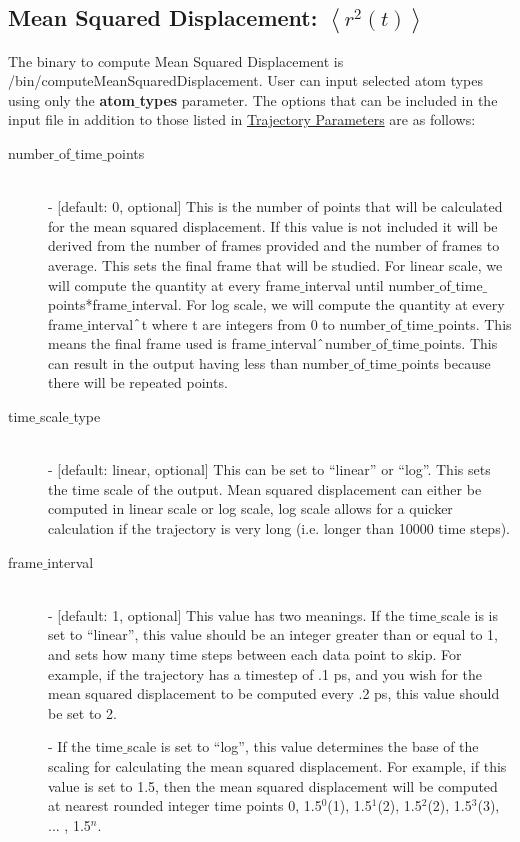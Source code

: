 \documentclass{article}
\begin{document}
\subsection{Mean Squared Displacement: $\left<r^2(t)\right>$} \label{sec::MSD_parm}
The binary to compute Mean Squared Displacement is /bin/computeMeanSquaredDisplacement. User can input selected atom types using only the \textbf{atom$\_$types} parameter. The options that can be included in the input file in addition to those listed in \hyperref[sec::general_parameters]{Trajectory Parameters} are as follows:
\begin{description}	
	\item[number$\_$of$\_$time$\_$points]\hfill \\
	- [default: 0, optional] This is the number of points that will be calculated for the mean squared displacement.  If this value is not included it will be derived from the number of frames provided and the number of frames to average.  This sets the final frame that will be studied.  For linear scale, we will compute the quantity at every frame$\_$interval until number$\_$of$\_$time$\_$points*frame$\_$interval.  For log scale, we will compute the quantity at every frame$\_$interval$\string^$t where t are integers from 0 to number$\_$of$\_$time$\_$points.  This means the final frame used is frame$\_$interval$\string^$number$\_$of$\_$time$\_$points.  This can result in the output having less than number$\_$of$\_$time$\_$points because there will be repeated points.
	
	\item[time$\_$scale$\_$type] \hfill \\
	- [default: linear, optional] This can be set to ``linear'' or ``log''.  This sets the time scale of the output. Mean squared displacement can either be computed in linear scale or log scale, log scale allows for a quicker calculation if the trajectory is very long (i.e. longer than 10000 time steps).
	
	\item[frame$\_$interval] \hfill \\
	- [default: 1, optional] This value has two meanings.  If the time$\_$scale is is set to ``linear'', this value should be an integer greater than or equal to 1, and sets how many time steps between each data point to skip.  For example, if the trajectory has a timestep of .1 ps, and you wish for the mean squared displacement to be computed every .2 ps, this value should be set to 2. 
	
	- If the time$\_$scale is set to ``log'', this value determines the base of the scaling for calculating the mean squared displacement.  For example, if this value is set to 1.5, then the mean squared displacement will be computed at nearest rounded integer time points 0, 1.5$^0$(1), 1.5$^1$(2), 1.5$^2$(2), 1.5$^3$(3), ... , 1.5$^{n}$.
	

\end{description}
\end{document}
